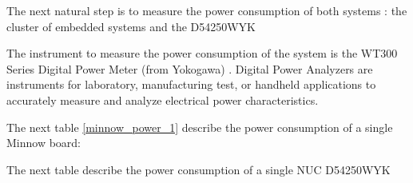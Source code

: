 The next natural step is to measure the power consumption of both systems : the
cluster of embedded systems and the D54250WYK

The instrument to measure the power consumption of the system is the WT300
Series Digital Power Meter (from Yokogawa) . Digital Power Analyzers are
instruments for laboratory, manufacturing test, or handheld applications to
accurately measure and analyze electrical power characteristics.

The next table \ref{minnow_power_1} describe the power consumption of a single Minnow board: 

\begin{table}[]
    \centering
    \label{minnow_power_1}
\end{table}


The next table describe the power consumption of a single NUC D54250WYK


